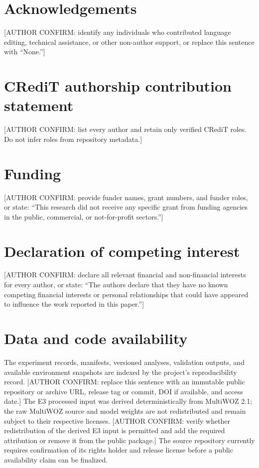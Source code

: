 \section*{Acknowledgements}
[AUTHOR CONFIRM: identify any individuals who contributed language editing, technical assistance, or other non-author support, or replace this sentence with ``None.'']

\section*{CRediT authorship contribution statement}
[AUTHOR CONFIRM: list every author and retain only verified CRediT roles. Do not infer roles from repository metadata.]

\section*{Funding}
[AUTHOR CONFIRM: provide funder names, grant numbers, and funder roles, or state: ``This research did not receive any specific grant from funding agencies in the public, commercial, or not-for-profit sectors.'']

\section*{Declaration of competing interest}
[AUTHOR CONFIRM: declare all relevant financial and non-financial interests for every author, or state: ``The authors declare that they have no known competing financial interests or personal relationships that could have appeared to influence the work reported in this paper.'']

\section*{Data and code availability}
The experiment records, manifests, versioned analyses, validation outputs, and available environment snapshots are indexed by the project's reproducibility record. [AUTHOR CONFIRM: replace this sentence with an immutable public repository or archive URL, release tag or commit, DOI if available, and access date.] The E3 processed input was derived deterministically from MultiWOZ 2.1; the raw MultiWOZ source and model weights are not redistributed and remain subject to their respective licenses. [AUTHOR CONFIRM: verify whether redistribution of the derived E3 input is permitted and add the required attribution or remove it from the public package.] The source repository currently requires confirmation of its rights holder and release license before a public availability claim can be finalized.

